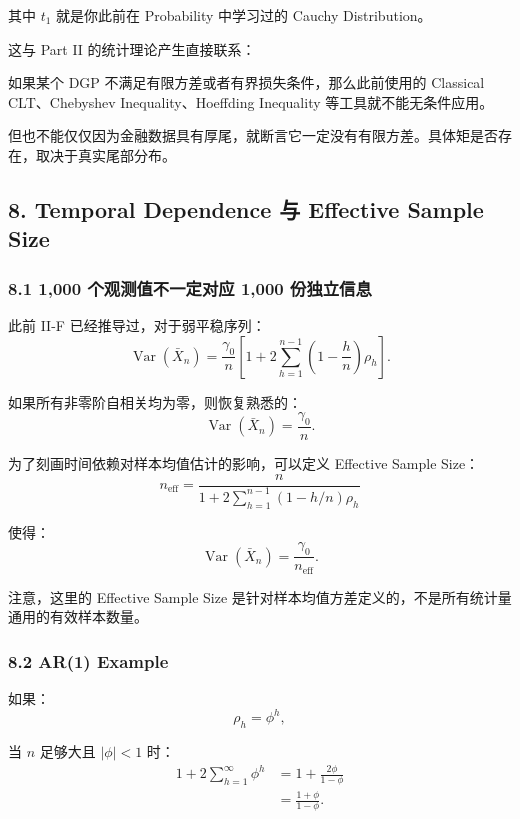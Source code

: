 其中 \(t_1\) 就是你此前在 Probability 中学习过的 Cauchy Distribution。

这与 Part II 的统计理论产生直接联系：

如果某个 DGP 不满足有限方差或者有界损失条件，那么此前使用的 Classical CLT、Chebyshev Inequality、Hoeffding Inequality 等工具就不能无条件应用。

但也不能仅仅因为金融数据具有厚尾，就断言它一定没有有限方差。具体矩是否存在，取决于真实尾部分布。

\hypertarget{part-4-52-0680-temporal-dependence-ux4e0e-effective-sample-size}{%
\subsection{8. Temporal Dependence 与 Effective Sample Size}\label{part-4-52-0680-temporal-dependence-ux4e0e-effective-sample-size}}

\hypertarget{part-4-52-0680-ux4e2aux89c2ux6d4bux503cux4e0dux4e00ux5b9aux5bf9ux5e94-1000-ux4efdux72ecux7acbux4fe1ux606f}{%
\subsubsection{8.1 1,000 个观测值不一定对应 1,000 份独立信息}\label{part-4-52-0680-ux4e2aux89c2ux6d4bux503cux4e0dux4e00ux5b9aux5bf9ux5e94-1000-ux4efdux72ecux7acbux4fe1ux606f}}

此前 II-F 已经推导过，对于弱平稳序列：
\[\operatorname{Var}(\bar X_n)
=
\frac{\gamma_0}{n}
\left[
1+
2\sum_{h=1}^{n-1}
\left(1-\frac hn\right)\rho_h
\right].\]

如果所有非零阶自相关均为零，则恢复熟悉的：
\[\operatorname{Var}(\bar X_n)=\frac{\gamma_0}{n}.\]

为了刻画时间依赖对样本均值估计的影响，可以定义 Effective Sample Size：
\[\boxed{
n_{\mathrm{eff}}
=
\frac{n}{
1+
2\sum_{h=1}^{n-1}
(1-h/n)\rho_h
}
}\]

使得：
\[\operatorname{Var}(\bar X_n)
=
\frac{\gamma_0}{n_{\mathrm{eff}}}.\]

注意，这里的 Effective Sample Size 是针对样本均值方差定义的，不是所有统计量通用的有效样本数量。

\hypertarget{part-4-52-0680-ar1-example}{%
\subsubsection{8.2 AR(1) Example}\label{part-4-52-0680-ar1-example}}

如果：
\[\rho_h=\phi^h,\]

当 \(n\) 足够大且 \(|\phi|<1\) 时：
\[\begin{aligned}
1+2\sum_{h=1}^{\infty}\phi^h
&=1+\frac{2\phi}{1-\phi}\\
&=\frac{1+\phi}{1-\phi}.
\end{aligned}\]

